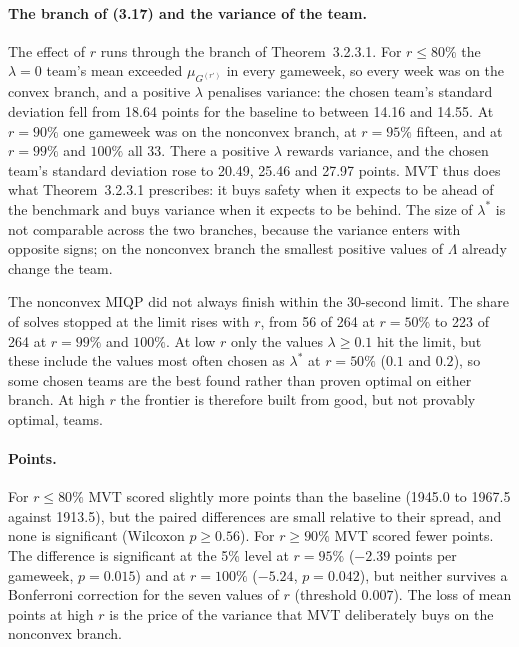 \documentclass[12pt,oneside,a4paper]{book}
\theoremstyle{definition}
\theoremstyle{remark}
\begin{document}
	\paragraph{The branch of (3.17) and the variance of the team.} The effect of $r$ runs through
	the branch of Theorem~3.2.3.1. For $r\le 80\%$ the $\lambda=0$ team's mean exceeded
	$\mu_{G^{(r')}}$ in every gameweek, so every week was on the convex branch, and a positive
	$\lambda$ penalises variance: the chosen team's standard deviation fell from 18.64 points for
	the baseline to between 14.16 and 14.55. At $r=90\%$ one gameweek was on the nonconvex branch,
	at $r=95\%$ fifteen, and at $r=99\%$ and $100\%$ all 33. There a positive $\lambda$ rewards
	variance, and the chosen team's standard deviation rose to 20.49, 25.46 and 27.97 points.
	MVT thus does what Theorem~3.2.3.1 prescribes: it buys safety when it expects to be ahead of the
	benchmark and buys variance when it expects to be behind. The size of $\lambda^*$ is not
	comparable across the two branches, because the variance enters with opposite signs; on the
	nonconvex branch the smallest positive values of $\Lambda$ already change the team.

	The nonconvex MIQP did not always finish within the 30-second limit. The share of solves
	stopped at the limit rises with $r$, from 56 of 264 at $r=50\%$ to 223 of 264 at $r=99\%$ and
	$100\%$. At low $r$ only the values $\lambda\ge 0.1$ hit the limit, but these include the
	values most often chosen as $\lambda^*$ at $r=50\%$ ($0.1$ and $0.2$), so some chosen teams are
	the best found rather than proven optimal on either branch.
	At high $r$ the frontier is therefore built from good, but not provably optimal, teams.

	\paragraph{Points.} For $r\le 80\%$ MVT scored slightly more points than the baseline (1945.0
	to 1967.5 against 1913.5), but the paired differences are small relative to their spread, and
	none is significant (Wilcoxon $p\ge 0.56$). For $r\ge 90\%$ MVT scored fewer points. The
	difference is significant at the 5\% level at $r=95\%$ ($-2.39$ points per gameweek, $p=0.015$)
	and at $r=100\%$ ($-5.24$, $p=0.042$), but neither survives a Bonferroni correction for the
	seven values of $r$ (threshold $0.007$). The loss of mean points at high $r$ is the price of the
	variance that MVT deliberately buys on the nonconvex branch.
\end{document}
